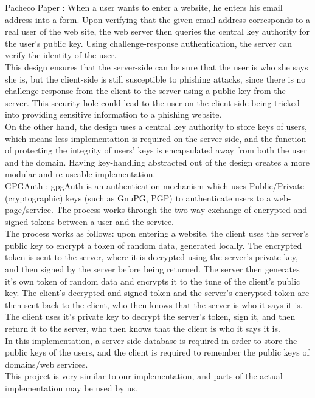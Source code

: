 \documentclass[11pt]{article}
\begin{document}
Pacheco Paper \cite{pacheco}:
When a user wants to enter a website, he enters his email address into a form. Upon verifying that the given email address corresponds to a real user of the web site, the web server then queries the central key authority for the user's public key. Using challenge-response authentication, the server can verify the identity of the user.\\
	This design ensures that the server-side can be sure that the user is who she says she is, but the client-side is still susceptible to phishing attacks, since there is no challenge-response from the client to the server using a public key from the server.  This security hole could lead to the user on the client-side being tricked into providing sensitive information to a phishing website.\\
	On the other hand, the design uses a central key authority to store keys of users, which means less implementation is required on the server-side, and the function of protecting the integrity of users' keys is encapsulated away from both the user and the domain.  Having key-handling abstracted out of the design creates a more modular and re-useable implementation.\\

GPGAuth \cite{gpgauth}:
gpgAuth is an authentication mechanism which uses Public/Private (cryptographic) keys (such as GnuPG, PGP) to authenticate users to a web-page/service.  The process works through the two-way exchange of encrypted and signed tokens between a user and the service.\\
	The process works as follows: upon entering a website, the client uses the server's public key to encrypt a token of random data, generated locally.  The encrypted token is sent to the server, where it is decrypted using the server's private key, and then signed by the server before being returned.  The server then generates it's own token of random data and encrypts it to the tune of the client's public key.  The client's decrypted and signed token  and the server's encrypted token are then sent back to the client, who then knows that the server is who it says it is.  The client uses it's private key to decrypt the server's token, sign it, and then return it to the server, who then knows that the client is who it says it is.\\
	In this implementation, a server-side database is required in order to store the public keys of the users, and the client is required to remember the public keys of domains/web services.\\
	This project is very similar to our implementation, and parts of the actual implementation may be used by us.


{}
\end{document}
